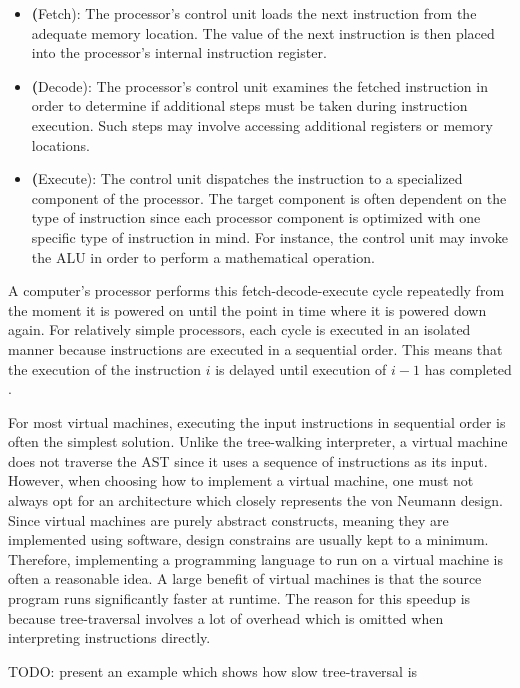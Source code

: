 \begin{itemize}
	\item \textbf(Fetch): The processor's control unit loads the next instruction from the adequate memory location.
	      The value of the next instruction is then placed into the processor's internal instruction register.
	\item \textbf(Decode):
	      The processor's control unit examines the fetched instruction in order to determine if additional steps must be taken during instruction execution.
	      Such steps may involve accessing additional registers or memory locations.
	\item \textbf(Execute):
	      The control unit dispatches the instruction to a specialized component of the processor.
	      The target component is often dependent on the type of instruction since each processor component is optimized with one specific type of instruction in mind.
	      For instance, the control unit may invoke the ALU in order to perform a mathematical operation.
\end{itemize}

A computer's processor performs this fetch-decode-execute cycle repeatedly from the moment it is powered on until the point in time where it is powered down again.
For relatively simple processors, each cycle is executed in an isolated manner because instructions are executed in a sequential order.
This means that the execution of the instruction $i$ is delayed until execution of $i - 1$ has completed \cite[pp.~208-209]{Ledin2020-yp}.

For most virtual machines, executing the input instructions in sequential order is often the simplest solution.
Unlike the tree-walking interpreter, a virtual machine does not traverse the AST since it uses a sequence of instructions as its input.
However, when choosing how to implement a virtual machine, one must not always opt for an architecture which closely represents the von Neumann design.
Since virtual machines are purely abstract constructs, meaning they are implemented using software, design constrains are usually kept to a minimum.
Therefore, implementing a programming language to run on a virtual machine is often a reasonable idea.
A large benefit of virtual machines is that the source program runs significantly faster at runtime.
The reason for this speedup is because tree-traversal involves a lot of overhead which is omitted when interpreting instructions directly.

TODO: present an example which shows how slow tree-traversal is 

